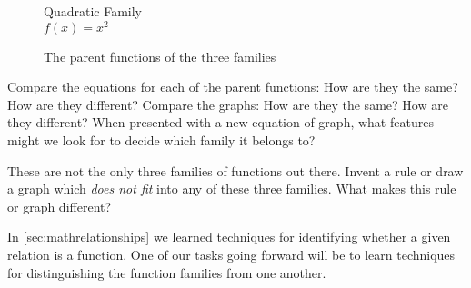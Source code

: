 \begin{figure}
\begin{minipage}{0.32\linewidth}
\end{minipage}
\begin{minipage}{0.32\linewidth}
\centering
Quadratic Family
\\ $f(x)=x^2$\par\medskip
{}
\end{minipage}
\caption{The parent functions of the three families}
\label{fig:parents}
\end{figure}

Compare the equations for each of the parent functions: How are they the same? How are they different? Compare the graphs: How are they the same? How are they different? When presented with a new equation of graph, what features might we look for to decide which family it belongs to?

These are not the only three families of functions out there. Invent a rule or draw a graph which \textit{does not fit} into any of these three families. What makes this rule or graph different?

In \cref{sec:mathrelationships} we learned techniques for identifying whether a given relation is a function. One of our tasks going forward will be to learn techniques for distinguishing the function families from one another.


